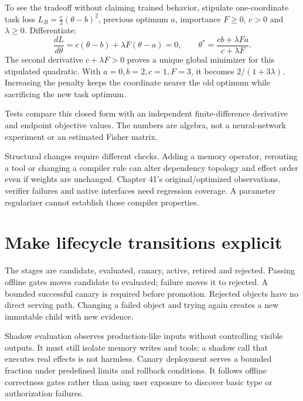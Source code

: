 To see the tradeoff without claiming trained behavior, stipulate one-coordinate
task loss $L_B=\tfrac c2(\theta-b)^2$, previous optimum $a$, importance $F\ge0$,
$c>0$ and $\lambda\ge0$. Differentiate:
\[
 \frac{dL}{d\theta}=c(\theta-b)+\lambda F(\theta-a)=0,
 \qquad
 \theta^*=\frac{cb+\lambda Fa}{c+\lambda F}.
\]
The second derivative $c+\lambda F>0$ proves a unique global minimizer for
this stipulated quadratic. With $a=0,b=2,c=1,F=3$, it becomes
$2/(1+3\lambda)$. Increasing the penalty keeps the coordinate nearer the
old optimum while sacrificing the new task optimum.
\begin{center}\end{center}
Tests compare this closed form with an independent finite-difference derivative
and endpoint objective values. The numbers are algebra, not a neural-network
experiment or an estimated Fisher matrix.

Structural changes require different checks. Adding a memory operator,
rerouting a tool or changing a compiler rule can alter dependency topology
and effect order even if weights are unchanged. Chapter 41's original/optimized
observations, verifier failures and native interfaces need regression coverage.
A parameter regularizer cannot establish those compiler properties.

\section{Make lifecycle transitions explicit}
\label{evod43:lifecycle}
The stages are candidate, evaluated, canary, active, retired and rejected.
Passing offline gates moves candidate to evaluated; failure moves it to
rejected. A bounded successful canary is required before promotion.
Rejected objects have no direct serving path. Changing a failed object and
trying again creates a new immutable child with new evidence.


Shadow evaluation observes production-like inputs without controlling visible
outputs. It must still isolate memory writes and tools; a shadow call that
executes real effects is not harmless. Canary deployment serves a bounded
fraction under predefined limits and rollback conditions. It follows offline
correctness gates rather than using user exposure to discover basic type or
authorization failures.

